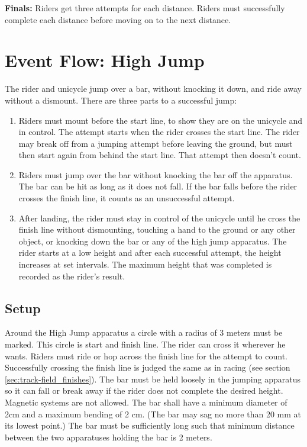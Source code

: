 \textbf{Finals:}
Riders get three attempts for each distance.
Riders must successfully complete each distance before moving on to the next distance.

\section{Event Flow: High Jump}
The rider and unicycle jump over a bar, without knocking it down, and ride away without a dismount.
There are three parts to a successful jump: 
\begin{enumerate}
\item Riders must mount before the start line, to show they are on the unicycle and in control.
The attempt starts when the rider crosses the start line.
The rider may break off from a jumping attempt before leaving the ground, but must then start again from behind the start line.
That attempt then doesn't count.
\item Riders must jump over the bar without knocking the bar off the apparatus.
The bar can be hit as long as it does not fall.
If the bar falls before the rider crosses the finish line, it counts as an unsuccessful attempt.
\item After landing, the rider must stay in control of the unicycle until he cross the finish line without dismounting, touching a hand to the ground or any other object, or knocking down the bar or any of the high jump apparatus.
The rider starts at a low height and after each successful attempt, the height increases at set intervals.
The maximum height that was completed is recorded as the rider's result.
\end{enumerate}

\subsection{Setup}
Around the High Jump apparatus a circle with a radius of 3 meters must be marked.
This circle is start and finish line.
The rider can cross it wherever he wants.
Riders must ride or hop across the finish line for the attempt to count.
Successfully crossing the finish line is judged the same as in racing (see section \ref{sec:track-field_finishes}).
The bar must be held loosely in the jumping apparatus so it can fall or break away if the rider does not complete the desired height.
Magnetic systems are not allowed.
The bar shall have a minimum diameter of 2cm and a maximum bending of 2 cm.
(The bar may sag no more than 20 mm at its lowest point.)
The bar must be sufficiently long such that minimum distance between the two apparatuses holding the bar is 2 meters.


